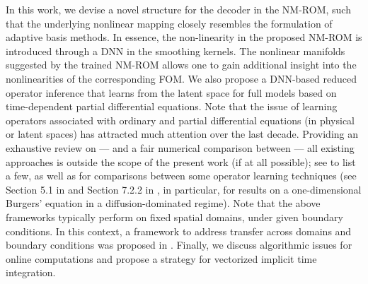 In this work, we devise a novel structure for the decoder in the NM-ROM, such that the underlying nonlinear mapping closely resembles the formulation of adaptive basis methods. In essence, the non-linearity in the proposed NM-ROM is introduced through a DNN in the smoothing kernels. The nonlinear manifolds suggested by the trained NM-ROM allows one to gain additional insight into the nonlinearities of the corresponding FOM. We also propose a DNN-based reduced operator inference that learns from the latent space for full models based on time-dependent partial differential equations. Note that the issue of learning operators associated with ordinary and partial differential equations (in physical or latent spaces) has attracted much attention over the last decade. Providing an exhaustive review on --- and a fair numerical comparison between --- all existing approaches is outside the scope of the present work (if at all possible); see \cite{lu2021learning,li2020fourier, li2022fourier,wen2022u,lu2021deepxde,pang2019fpinns,zhang2019quantifying,li2020multipole,li2020neural,tran2021factorized,guibas2021adaptive,tripura2022wavelet,gupta2021multiwavelet,kovachki2021neural,jin2022mionet,li2021physics,raonic2023convolutional,batlle2023kernel} to list a few, as well as \cite{LU2022114778,kovachki2023neural} for comparisons between some operator learning techniques (see Section 5.1 in \cite{LU2022114778} and Section 7.2.2 in \cite{kovachki2023neural}, in particular, for results on a one-dimensional Burgers' equation in a diffusion-dominated regime). Note that the above frameworks typically perform on fixed spatial domains, under given boundary conditions. In this context, a framework to address transfer across domains and boundary conditions was proposed in \cite{WANG2022114424}. Finally, we discuss algorithmic issues for online computations and propose a strategy for vectorized implicit time integration. 



